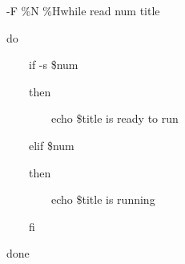 \pagebreak[11]
\begin{expara}

\BtjlistName{} -F {\textquotesingle}\%N \%H{\textquotesingle}{\textbar}while
read num title

do

\ \ \ \ if \BtjstatName{} -s {\textquotesingle}{\textquotesingle} \$num

\ \ \ \ then

\ \ \ \ \ \ \ \ echo \$title is ready to run

\ \ \ \ elif \BtjstatName{} \$num

\ \ \ \ then

\ \ \ \ \ \ \ \ echo \$title is running

\ \ \ \ fi

done

\end{expara}

